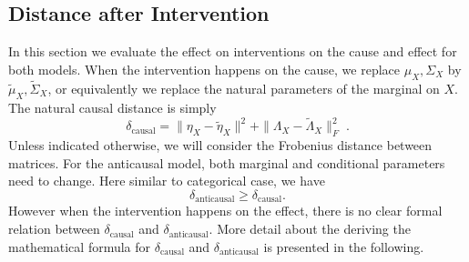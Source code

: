 \begin{subappendices}
\subsection{Distance after Intervention}
\label{apdx:normal_interventions}
In this section we evaluate the effect on interventions on the cause and effect for both models. When the intervention happens on the cause, we replace $\mu_X, \Sigma_X$ by $\tilde \mu_X, \tilde \Sigma_X$, or equivalently we replace the natural parameters of the marginal on $X$.
The natural causal distance is simply
\begin{equation}
    \delta_\text{causal}
    = \|\eta_X - \tilde \eta_X \|^2 
    +  \|\Lambda_X - \tilde \Lambda_X \|^2_F \; .
\end{equation}
Unless indicated otherwise, we will consider the Frobenius distance between matrices.
For the anticausal model, both  marginal and conditional parameters need to change. Here similar to categorical case, we have 
\[
     \delta_\text{anticausal} \geq  \delta_\text{causal}. 
\]
However when the intervention happens on the effect, there is no clear formal relation between $\delta_\text{causal}$ and $\delta_\text{anticausal}$. More detail about the deriving the mathematical formula for $\delta_\text{causal}$ and $\delta_\text{anticausal}$ is presented in the following. 


\end{subappendices}
